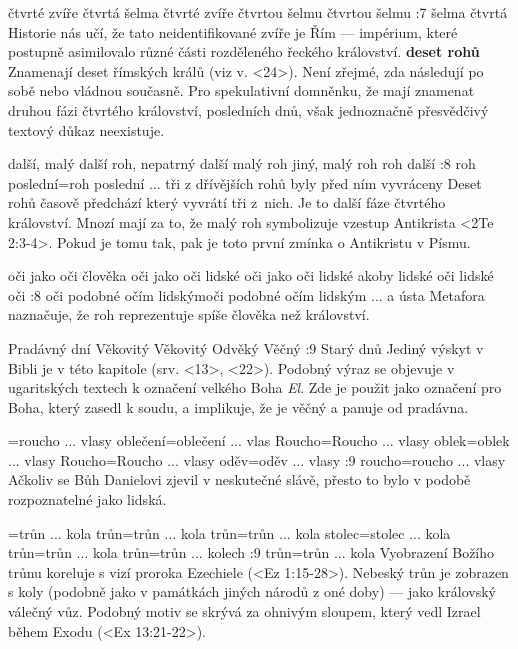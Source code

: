    {čtvrté zvíře}   %
   {čtvrtá šelma}   %
   {čtvrté zvíře}   %
   {čtvrtou šelmu}   %
   {čtvrtou šelmu}   %
:7 {šelma čtvrtá}
     Historie nás učí, že tato neidentifikované zvíře je Řím --- impérium, které postupně
     asimilovalo různé části rozděleného řeckého království. 
     {\bf deset rohů} Znamenají deset římských králů (viz v. <24>). Není zřejmé, zda následují po      sobě nebo vládnou současně. Pro spekulativní domněnku, že mají znamenat druhou fázi čtvrtého    království,  posledních dnů, však jednoznačně přesvědčivý textový      důkaz neexistuje. 

   {další, malý}   %
   {další roh, nepatrný}   %
   {další malý roh}   %
   {jiný, malý roh}   %
   {roh další}   %
:8 {roh poslední}={roh poslední ... tři z dřívějších rohů byly před ním vyvráceny}
     Deset rohů časově předchází  který vyvrátí tři z~nich. Je to další fáze
     čtvrtého království. Mnozí mají za to, že malý roh symbolizuje vzestup Antikrista 
     <2Te 2:3-4>. Pokud je tomu tak, pak je toto první zmínka o Antikristu v Písmu.  

   {oči jako oči člověka}   %
   {oči jako oči lidské}   %
   {oči jako oči lidské}   %
   {akoby lidské oči}   %
   {lidské oči}   %
:8 {oči podobné očím lidským}{oči podobné očím lidským ... a ústa}
     Metafora naznačuje, že roh reprezentuje spíše člověka než království. 
     
   {Pradávný dní}   %
   {Věkovitý}   %
   {Věkovitý}   %
   {Odvěký}   %
   {Věčný}   %
:9 {Starý dnů} Jediný výskyt v Bibli je v této kapitole (srv. <13>, <22>). Podobný výraz se objevuje v ugaritských textech k označení velkého Boha  {\em El}. Zde je použit jako označení pro Boha, který zasedl k soudu, a implikuje, že je věčný a  panuje od pradávna.

={roucho ... vlasy}   %
   {oblečení}={oblečení ... vlas}   %
   {Roucho}={Roucho ... vlasy}    %
   {oblek}={oblek ... vlasy}    %
   {Roucho}={Roucho ... vlasy}    %
   {oděv}={oděv ... vlasy}    %
:9 {roucho}={roucho ... vlasy} Ačkoliv se Bůh Danielovi zjevil v neskutečné slávě, přesto to bylo v podobě rozpoznatelné jako lidská.

={trůn ... kola} %
    {trůn}={trůn ... kola} %
     {trůn}={trůn ... kola}  %
     {stolec}={stolec ... kola} %
     {trůn}={trůn ... kola}  %
     {trůn}={trůn ... kolech}  %
:9 {trůn}={trůn ... kola} Vyobrazení Božího trůnu koreluje s vizí proroka Ezechiele (<Ez 1:15-28>).
      Nebeský trůn je zobrazen s koly (podobně jako v památkách jiných národů z oné doby) --- jako královský válečný vůz. Podobný motiv se skrývá za ohnivým sloupem, který vedl Izrael během Exodu (<Ex 13:21-22>).

